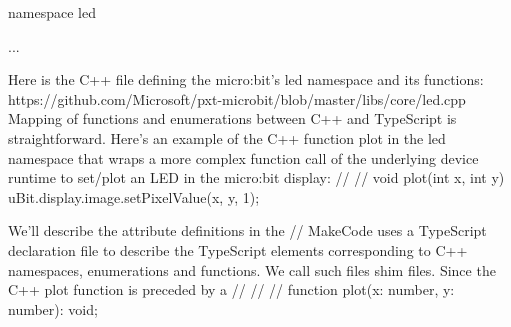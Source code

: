 namespace led {
...
    	 

Here is the C++ file defining the micro:bit’s led namespace and its functions:
https://github.com/Microsoft/pxt-microbit/blob/master/libs/core/led.cpp
Mapping of functions and enumerations between C++ and TypeScript is straightforward. Here’s an example of the C++ function plot in the led namespace that wraps a more complex function call of the underlying device runtime to set/plot an LED in the micro:bit display:
//%
//%
void plot(int x, int y) {
    uBit.display.image.setPixelValue(x, y, 1);
}

We’ll describe the attribute definitions in the //%
MakeCode uses a  TypeScript declaration file to describe the TypeScript elements corresponding to C++ namespaces, enumerations and functions.  We call such files shim files.  Since the C++ plot function is preceded by a //%
//%
//%
function plot(x: number, y: number): void;

}
